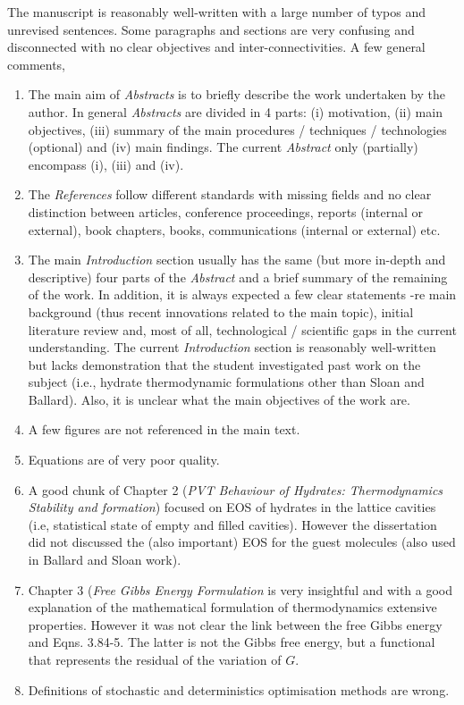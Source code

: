 \documentclass[14pt,twoside]{report}
\begin{document}
The manuscript is reasonably well-written with a large number of typos and unrevised sentences. Some paragraphs and sections are very confusing and disconnected with no clear objectives and inter-connectivities. A few general comments,
\begin{enumerate}
%
\item The main aim of {\it Abstracts} is to briefly describe the work undertaken by the author. In general {\it Abstracts} are divided in 4 parts: (i) motivation, (ii) main objectives, (iii) summary of the main procedures / techniques / technologies (optional) and (iv) main findings. The current {\it Abstract} only (partially) encompass (i), (iii) and (iv).
%
\item The {\it References} follow different standards with missing fields and no clear distinction between articles, conference proceedings, reports (internal or external), book chapters, books, communications (internal or external) etc.  
%
\item The main {\it Introduction} section usually has the same (but more in-depth and descriptive) four parts of the {\it Abstract} and a brief summary of the remaining of the work. In addition, it is always expected a few clear statements -re main background (thus recent innovations related to the main topic), initial literature review and, most of all, technological / scientific gaps in the current understanding. The current {\it Introduction} section is reasonably well-written but lacks demonstration that the student investigated past work on the subject (i.e., hydrate thermodynamic formulations other than Sloan and Ballard). Also, it is unclear what the main objectives of the work are.
%
\item A few figures are not referenced in the main text.
%
\item Equations are of very poor quality.
%
\item A good chunk of Chapter 2 ({\it PVT Behaviour of Hydrates: Thermodynamics Stability and formation}) focused on EOS of hydrates in the lattice cavities (i.e, statistical state of empty and filled cavities). However the dissertation did not discussed the (also important) EOS for the guest molecules (also used in Ballard and Sloan work).  
%
\item Chapter 3 ({\it Free Gibbs Energy Formulation} is very insightful and with a good explanation of the mathematical formulation of thermodynamics extensive properties. However it was not clear the link between the free Gibbs energy and Eqns. 3.84-5. The latter is not the Gibbs free energy, but a functional that represents the residual of the variation of $G$.
%
\item Definitions of stochastic and deterministics optimisation methods are wrong. 
%
\end{enumerate}
\end{document}
